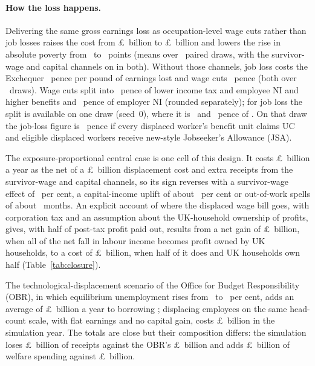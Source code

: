 \paragraph{How the loss happens.} Delivering the same gross earnings loss as occupation-level wage cuts rather than job losses raises the cost from \pounds\genWcJobCostMeanTwoDpBn~billion to \pounds\genWcWageCostMeanTwoDpBn~billion and lowers the rise in absolute poverty from \genWcJobPovBhcMeanPp~to \genWcWagePovBhcMeanPp~points (means over \genWcDraws~paired draws, with the survivor-wage and capital channels on in both). Without those channels, job loss costs the Exchequer \genAbsJobGovDrawsPct~pence per pound of earnings lost and wage cuts \genAbsCutGovPct~pence (both over \genWcDraws~draws). Wage cuts split into \genAbsCutHhPct~pence of lower income tax and employee NI and higher benefits and \genAbsCutErNiPct~pence of employer NI (rounded separately); for job loss the split is available on one draw (seed~0), where it is \genAbsJobHhPct~and \genAbsJobRestPct~pence of \genAbsJobGovPct. On that draw the job-loss figure is \genAbsJobGovJsaPct~pence if every displaced worker's benefit unit claims UC and eligible displaced workers receive new-style Jobseeker's Allowance (JSA).

The exposure-proportional central case is one cell of this design. It costs \pounds\genCentralMcCostMeanBn~billion a year as the net of a \pounds\genChannelMcDispCostAbsBn~billion displacement cost and extra receipts from the survivor-wage and capital channels, so its sign reverses with a survivor-wage effect of \genBeWagePct~per cent, a capital-income uplift of about \genBeCapInterpUpliftPct~per cent or out-of-work spells of about \genBeDurMonths~months. An explicit account of where the displaced wage bill goes, with corporation tax and an assumption about the UK-household ownership of profits, gives, with half of post-tax profit paid out, results from a net gain of \pounds\genFaClosedPhiOneShareOneAbsBn~billion, when all of the net fall in labour income becomes profit owned by UK households, to a cost of \pounds\genFaClosedPhiHalfShareHalfAbsBn~billion, when half of it does and UK households own half (Table~\ref{tab:closure}).

The technological-displacement scenario of the Office for Budget Responsibility (OBR), in which equilibrium unemployment rises from \genObrUnempBasePct~to \genObrUnempScenPct~per cent, adds an average of \pounds\genObrBorrowingBn~billion a year to borrowing \citep{obr2026}; displacing employees on the same head-count scale, with flat earnings and no capital gain, costs \pounds\genObrCostMeanBn~billion in the simulation year. The totals are close but their composition differs: the simulation loses \pounds\genObrReceiptsBn~billion of receipts against the OBR's \pounds\genObrReceiptsLostBn~billion and adds \pounds\genObrWelfareBn~billion of welfare spending against \pounds\genObrWelfareAddedBn~billion.

